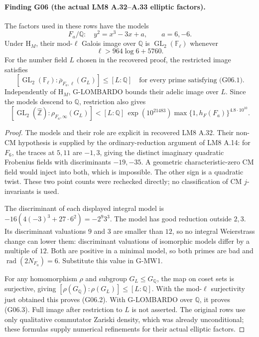 \paragraph{Finding G06 (the actual LM8 A.32--A.33 elliptic factors).}
The factors used in these rows have the models
\[
 F_a/\mathbb Q:\quad y^2=x^3-3x+a,\qquad a=6,-6.
\]
Under $\mathrm H_M$, their mod-$\ell$ Galois image over $\mathbb Q$ is
$\operatorname{GL}_2(\mathbb F_\ell)$ whenever
\[
 \ell>964\log6+5760. \tag{G06.1}
\]
For the number field $L$ chosen in the recovered proof, the restricted
image satisfies
\[
 [\operatorname{GL}_2(\mathbb F_\ell):
       \overline\rho_{F_a,\ell}(G_L)]\le[L:\mathbb Q]
 \quad\text{for every prime satisfying (G06.1).} \tag{G06.2}
\]
Independently of $\mathrm H_M$, G-LOMBARDO bounds their adelic image
over $L$. Since the models descend to $\mathbb Q$, restriction also gives
\[
 [\operatorname{GL}_2(\widehat{\mathbb Z}):\rho_{F_a,\infty}(G_L)]
 <[L:\mathbb Q]\,\exp(10^{21483})
          \max\{1,h_F(F_a)\}^{4.8\cdot10^{10}}. \tag{G06.3}
\]

\begin{proof}
The models and their role are explicit in recovered LM8 A.32.
Their non-CM hypothesis is supplied by the ordinary-reduction
argument of LM8 A.14: for $F_6$, the traces at $5,11$ are $-1,3$,
giving the distinct imaginary quadratic Frobenius fields with
discriminants $-19,-35$. A geometric characteristic-zero CM field
would inject into both, which is impossible. The other sign is a
quadratic twist. These two point counts were rechecked directly;
no classification of CM $j$-invariants is used.

The discriminant of each displayed integral model is
$-16(4(-3)^3+27\cdot6^2)=-2^9 3^3$.
The model has good reduction outside $2,3$. Its discriminant valuations
$9$ and $3$ are smaller than $12$, so no integral Weierstrass change
can lower them: discriminant valuations of isomorphic models differ
by a multiple of $12$. Both are positive in a minimal model, so both
primes are bad and $\operatorname{rad}(2N_{F_a})=6$.
Substitute this value in G-MW1.

For any homomorphism $\rho$ and subgroup $G_L\le G_{\mathbb Q}$,
the map on coset sets is surjective, giving
$[\rho(G_{\mathbb Q}):\rho(G_L)]\le[L:\mathbb Q]$.
With the mod-$\ell$ surjectivity just obtained this proves (G06.2).
With G-LOMBARDO over $\mathbb Q$, it proves (G06.3).
Full image after restriction to $L$ is not asserted. The original
rows use only qualitative commutator Zariski density, which was
already unconditional; these formulas supply numerical refinements
for their actual elliptic factors.
\end{proof}

